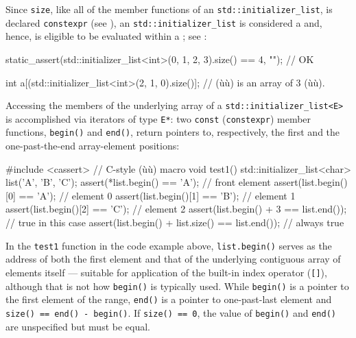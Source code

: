 Since \lstinline!size!, like all of the member functions of an
\lstinline!std::initializer_list!, is declared \lstinline!constexpr! (see ), an
\lstinline!std::initializer_list! is considered a 
and, hence, is eligible to be evaluated within a ; see : 

\begin{emcppslisting}
static_assert(std::initializer_list<int>({0, 1, 2, 3}).size() == 4, "");  // OK

int a[(std::initializer_list<int>({2, 1, 0}).size()];  // (ù{}ù) is an array of 3 (ù{}ù).
\end{emcppslisting}
    

\noindent Accessing the members of the underlying array of a
\lstinline!std::initializer_list<E>! is accomplished via iterators of type
\lstinline!E*!: two \lstinline!const! (\lstinline!constexpr!) member functions,
\lstinline!begin()! and \lstinline!end()!, return pointers to, respectively,
the first and the one-past-the-end array-element positions:

\begin{emcppslisting}
#include <cassert>  // C-style (ù{}ù) macro
void test1()
{
    std::initializer_list<char> list({'A', 'B', 'C'});
    assert(*list.begin()   == 'A');  // front element
    assert(list.begin()[0] == 'A');  // element 0
    assert(list.begin()[1] == 'B');  // element 1
    assert(list.begin()[2] == 'C');  // element 2
    assert(list.begin() + 3           == list.end());  // true in this case
    assert(list.begin() + list.size() == list.end());  // always true
}
\end{emcppslisting}
    

\noindent In the \lstinline!test1! function in the code example above,
\lstinline!list.begin()! serves as the address of both the first element
and that of the underlying contiguous array of elements itself ---
suitable for application of the built-in index operator (\lstinline![]!),
although that is not how \lstinline!begin()! is typically used. While
\lstinline!begin()! is a pointer to the first element of the range,
\lstinline!end()! is a pointer to one-past-last element and
\lstinline!size()!~\lstinline!==!~\lstinline!end()!~\lstinline!-!~\lstinline!begin()!.
If \lstinline!size()!~\lstinline!==!~\lstinline!0!, the value of \lstinline!begin()!
and \lstinline!end()! are unspecified but must be equal.


